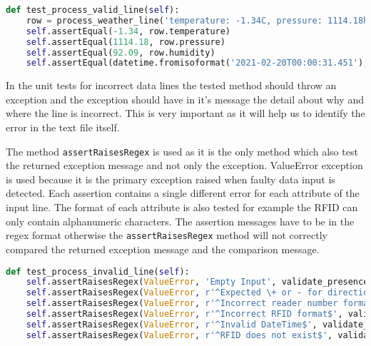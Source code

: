 \begin{lstlisting}[language={Python}]
def test_process_valid_line(self):
	row = process_weather_line('temperature: -1.34C, pressure: 1114.18hPa, humidity:  92.09%, time: 2021-02-20T00:00:31.451',WeatherFile.objects.first())
	self.assertEqual(-1.34, row.temperature)
	self.assertEqual(1114.18, row.pressure)
	self.assertEqual(92.09, row.humidity)
	self.assertEqual(datetime.fromisoformat('2021-02-20T00:00:31.451'), row.timestamp)
\end{lstlisting}

In the unit tests for incorrect data lines the tested method should throw an exception and the exception should have in it's 
message the detail about why and where the line is incorrect. This is very important as it will help us to identify the error
in the text file itself. 

The method \texttt{assertRaisesRegex} is used as it is the only method which also test the returned 
exception message and not only the exception. ValueError exception is used because it is the primary exception raised when faulty
data input is detected. Each assertion contains a single different error for each attribute of the input line. The format of each attribute is also tested 
for example the RFID can only contain alphanumeric characters. The assertion messages have to be in the regex format otherwise the 
\texttt{assertRaisesRegex} method will not correctly compared the returned exception message and the comparison message.

\begin{lstlisting}[language={Python}]
def test_process_invalid_line(self):
	self.assertRaisesRegex(ValueError, 'Empty Input', validate_presence_line, '')
	self.assertRaisesRegex(ValueError, r'^Expected \+ or - for direction$', validate_presence_line, '# 4 E20000195206006314302257 2020-07-13T19:39:05.998')
	self.assertRaisesRegex(ValueError, r'^Incorrect reader number format$', validate_presence_line, '+ 99 E20000195206006314302257 2020-07-13T19:39:05.998')
	self.assertRaisesRegex(ValueError, r'^Incorrect RFID format$', validate_presence_line, '+ 4 E2!@#$%^&*()7 2020-07-13T19:39:05.998')
	self.assertRaisesRegex(ValueError, r'^Invalid DateTime$', validate_presence_line, '+ 4 E20000195206006314302257 ABCD-07-13W19:39T:05.998')
	self.assertRaisesRegex(ValueError, r'^RFID does not exist$', validate_presence_line, '+ 4 E99999999999999999999999 2020-07-13T19:39:05.998')
\end{lstlisting}

